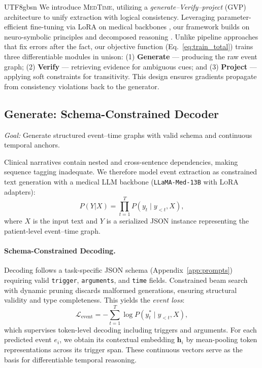 \documentclass[11pt]{article}
\begin{document}
\begin{CJK*}{UTF8}{gbsn}
We introduce \textsc{MedTime}, utilizing a \emph{generate–Verify–project} (GVP) architecture to unify extraction with logical consistency. Leveraging parameter-efficient fine-tuning via LoRA \cite{hu2021lora} on medical backbones \cite{wu2023pmcllama}, our framework builds on neuro-symbolic principles \cite{li2023scallop} and decomposed reasoning \cite{khot2023decomposed}. Unlike pipeline approaches that fix errors after the fact, our objective function (Eq.~\ref{eq:train_total}) trains three differentiable modules in unison: (1) \textbf{Generate} — producing the raw event graph; (2) \textbf{Verify} — retrieving evidence for ambiguous cues; and (3) \textbf{Project} — applying soft constraints for transitivity. This design ensures gradients propagate from consistency violations back to the generator.

\subsection{Generate: Schema-Constrained Decoder}
\textit{Goal:} Generate structured event–time graphs with valid schema and continuous temporal anchors.

Clinical narratives contain nested and cross-sentence dependencies, making sequence tagging inadequate. We therefore model event extraction as constrained text generation with a medical LLM backbone (\texttt{LLaMA-Med-13B} with \textsc{LoRA} adapters):
\begin{equation}
P(Y|X) = \prod_{t=1}^{T} P(y_t \mid y_{<t}, X),
\label{eq:decoder}
\end{equation}
where $X$ is the input text and $Y$ is a serialized JSON instance representing the patient-level event–time graph.

\paragraph{Schema-Constrained Decoding.}
Decoding follows a task-specific JSON schema (Appendix~\ref{app:prompts}) requiring valid \texttt{trigger}, \texttt{arguments}, and \texttt{time} fields. Constrained beam search with dynamic pruning discards malformed generations, ensuring structural validity and type completeness. This yields the \emph{event loss}:
\begin{equation}
\mathcal{L}_{\text{event}} = -\sum_{t=1}^{T} \log P(y_t^\ast \mid y_{<t}, X),
\label{eq:event_loss}
\end{equation}
which supervises token-level decoding including triggers and arguments. For each predicted event $e_i$, we obtain its contextual embedding $\mathbf{h}_i$ by mean-pooling token representations across its trigger span. These continuous vectors serve as the basis for differentiable temporal reasoning.


\end{CJK*}
\end{document}

